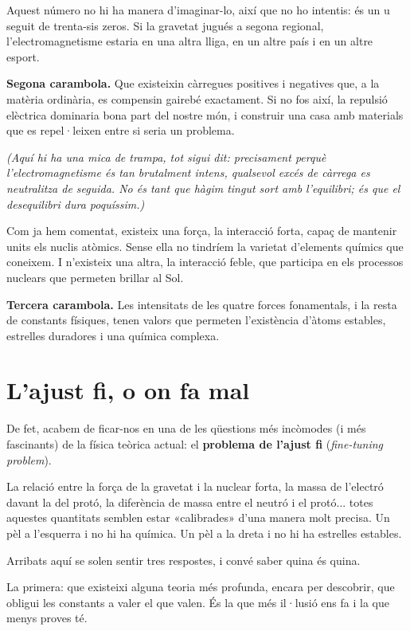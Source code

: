 Aquest número no hi ha manera d'imaginar-lo, així que no ho intentis: és un u seguit de trenta-sis zeros. Si la gravetat jugués a segona regional, l'electromagnetisme estaria en una altra lliga, en un altre país i en un altre esport.

\textbf{Segona carambola.} Que existeixin càrregues positives i negatives que, a la matèria ordinària, es compensin gairebé exactament. Si no fos així, la repulsió elèctrica dominaria bona part del nostre món, i construir una casa amb materials que es repel·leixen entre si seria un problema.

\textit{(Aquí hi ha una mica de trampa, tot sigui dit: precisament perquè l'electromagnetisme és tan brutalment intens, qualsevol excés de càrrega es neutralitza de seguida. No és tant que hàgim tingut sort amb l'equilibri; és que el desequilibri dura poquíssim.)}

Com ja hem comentat, existeix una força, la interacció forta, capaç de mantenir units els nuclis atòmics. Sense ella no tindríem la varietat d'elements químics que coneixem. I n'existeix una altra, la interacció feble, que participa en els processos nuclears que permeten brillar al Sol.

\textbf{Tercera carambola.} Les intensitats de les quatre forces fonamentals, i la resta de constants físiques, tenen valors que permeten l'existència d'àtoms estables, estrelles duradores i una química complexa.

\section{L'ajust fi, o on fa mal}

De fet, acabem de ficar-nos en una de les qüestions més incòmodes (i més fascinants) de la física teòrica actual: el \textbf{problema de l'ajust fi} (\textit{fine-tuning problem}).

La relació entre la força de la gravetat i la nuclear forta, la massa de l'electró davant la del protó, la diferència de massa entre el neutró i el protó... totes aquestes quantitats semblen estar «calibrades» d'una manera molt precisa. Un pèl a l'esquerra i no hi ha química. Un pèl a la dreta i no hi ha estrelles estables.

Arribats aquí se solen sentir tres respostes, i convé saber quina és quina.

La primera: que existeixi alguna teoria més profunda, encara per descobrir, que obligui les constants a valer el que valen. És la que més il·lusió ens fa i la que menys proves té.

